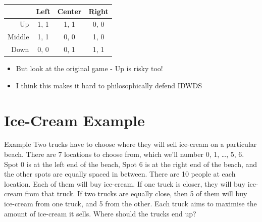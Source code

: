 \documentclass[
  14pt,
  letterpaper,
  ignorenonframetext,
  aspectratio=169,
]{beamer}
\providecommand{\tightlist}{%
  \setlength{\itemsep}{0pt}\setlength{\parskip}{0pt}}\usepackage{longtable,booktabs,array}
\let\olditem\item
\renewcommand{\item}{%
\olditem\vspace{6pt}}
\begin{document}
\begin{frame}
\begin{table}[!h]
\centering
\begin{tabular}[t]{>{}r|ccc}
\toprule
 & Left & Center & Right\\
\midrule
Up & 1, 1 & 1, 1 & 0, 0\\
Middle & 1, 1 & 0, 0 & 1, 0\\
Down & 0, 0 & 0, 1 & 1, 1\\
\bottomrule
\end{tabular}
\end{table}

\begin{itemize}[<+->]
\tightlist
\item
  But look at the original game - Up is risky too!
\item
  I think this makes it hard to philosophically defend IDWDS
\end{itemize}
\end{frame}

\hypertarget{ice-cream-example}{%
\section{Ice-Cream Example}\label{ice-cream-example}}

\begin{frame}{Example}
\protect\hypertarget{example}{}
Two trucks have to choose where they will sell ice-cream on a particular
beach. There are 7 locations to choose from, which we'll number 0, 1,
\ldots, 5, 6. Spot 0 is at the left end of the beach, Spot 6 is at the
right end of the beach, and the other spots are equally spaced in
between. There are 10 people at each location. Each of them will buy
ice-cream. If one truck is closer, they will buy ice-cream from that
truck. If two trucks are equally close, then 5 of them will buy
ice-cream from one truck, and 5 from the other. Each truck aims to
maximise the amount of ice-cream it sells. Where should the trucks end
up?
\end{frame}
\end{document}
